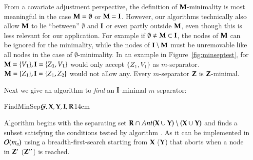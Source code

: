 From a covariate adjustment perspective, the definition of $ {\bf M} $-minimality  
is most meaningful in the case ${\bf M}=\emptyset$ or ${\bf M}={\bf I}$.
However, our algorithms technically also allow ${\bf M}$ to lie ``between'' $\emptyset$ and ${\bf I}$
or even partly outside ${\bf M}$, even though this is less relevant for our application.
For example if $ \emptyset \not= {\bf M} \subset {\bf I} $, the nodes of $ {\bf M} $ can be ignored for the minimality, 
while the nodes of $ {\bf I}\setminus{\bf M} $ must be unremovable like all nodes in 
the case of $ \emptyset $-minimality. In an example in Figure~\ref{fig:minseptest},
for $ {\bf M}=\{V_1\}, {\bf I}= \{Z_1, V_1\} $ would only accept $ \{Z_1, V_1\} $ as $m$-separator. $ {\bf M}=\{Z_1\}, {\bf I}= \{Z_1, Z_2\} $ would not allow any.  
%
%
Every $m$-separator $ {\bf Z}$ %
is ${\bf Z}$-minimal. %

%

Next we give an algorithm to \emph{find} an $ {\bf I} $-minimal $ m $-separator:

\begin{algo}{FindMinSep}{${\cal G}, {\bf X}, {\bf Y}, {\bf I}, {\bf R}$}{\label{algo:findminimalsepmoral}}{14cm}
%

%
%
{\Return{$\bot$}}
\EndIf
\State{\Return{$\bZ\cup \bI$}}
\end{algo}

\begin{analal}
%
%
%
%
%

Algorithm   begins 
with the separating set ${\bf R} \cap \textit{Ant}({\bf X} \cup {\bf Y})\setminus ({\bf X}\cup{\bf Y})$ 
and finds a subset satisfying the conditions tested 
by algorithm . As  it can be implemented in ${\cal O}(m_{a})$ using a breadth-first-search starting from ${\bf X}$ (${\bf Y}$) that aborts when a node in ${\bf Z}'$ (${\bf Z}''$) is reached.
\end{analal}

